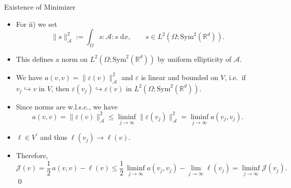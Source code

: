 \documentclass[10pt,aspectratio=169]{beamer}
\def\R{{\mathbb R}}
\def\cA{{\mathcal A}}
\def\cJ{{\mathcal J}}
\def\d{{\mathrm{d}}}
\def\dx{{\d x}}
\def\symd{{\mathrm{Sym}^2(\R^d)}}
\begin{document}
\begin{frame}{Existence of Minimizer}
	\begin{itemize}
		\item For ii) we set
		      \begin{equation*}
			      \|s\|_{\cA}^2:= \int_\Omega s:\cA :s \;\dx,\qquad s\in L^2(\Omega;\symd).
		      \end{equation*}
		\item This defines a norm on $L^2(\Omega;\symd)$ by uniform ellipticity of $\cA$.
		\item We have $a(v,v) = \|\varepsilon(v)\|_{\cA}^2$ and $\varepsilon$ is linear and bounded on $V$, i.e.\ if $v_j\hookrightarrow v$ in $V$, then $\varepsilon(v_j)\hookrightarrow\varepsilon(v)$ in $L^2(\Omega;\symd)$.
		\item Since norms are w.l.s.c., we have
		      \begin{equation*}
			      a(v,v)=\|\varepsilon(v)\|_\cA^2
			      \le \liminf_{j\to\infty}\|\varepsilon(v_j)\|_\cA^2
			      = \liminf_{j\to\infty} a(v_j,v_j).
		      \end{equation*}
		\item $\ell\in V^\prime$ and thus $\ell(v_j)\to\ell(v)$.
		\item Therefore,
		      \begin{equation*}
			      \cJ(v)=\frac{1}{2}\,a(v,v)-\ell(v)
			      \le \frac{1}{2}\,\liminf_{j\to\infty} a(v_j,v_j) - \lim_{j\to\infty}\ell(v_j)
			      = \liminf_{j\to\infty}\cJ(v_j).
		      \end{equation*}\qed
	\end{itemize}
\end{frame}
\end{document}

